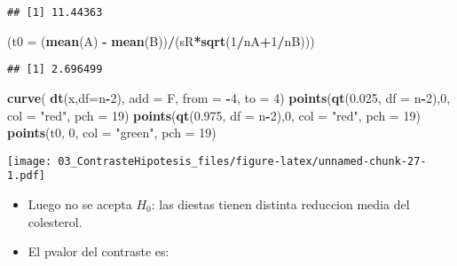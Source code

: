 \documentclass[]{article}
\newenvironment{Shaded}{\begin{snugshade}}{\end{snugshade}}
\newcommand{\KeywordTok}[1]{\textcolor[rgb]{0.13,0.29,0.53}{\textbf{#1}}}
\newcommand{\DataTypeTok}[1]{\textcolor[rgb]{0.13,0.29,0.53}{#1}}
\newcommand{\DecValTok}[1]{\textcolor[rgb]{0.00,0.00,0.81}{#1}}
\newcommand{\FloatTok}[1]{\textcolor[rgb]{0.00,0.00,0.81}{#1}}
\newcommand{\StringTok}[1]{\textcolor[rgb]{0.31,0.60,0.02}{#1}}
\newcommand{\OperatorTok}[1]{\textcolor[rgb]{0.81,0.36,0.00}{\textbf{#1}}}
\newcommand{\NormalTok}[1]{#1}
\begin{document}
\begin{verbatim}
## [1] 11.44363
\end{verbatim}

\begin{Shaded}
\begin{Highlighting}[]
\NormalTok{(}\DataTypeTok{t0 =}\NormalTok{ (}\KeywordTok{mean}\NormalTok{(A) }\OperatorTok{-}\StringTok{ }\KeywordTok{mean}\NormalTok{(B))}\OperatorTok{/}\NormalTok{(sR}\OperatorTok{*}\KeywordTok{sqrt}\NormalTok{(}\DecValTok{1}\OperatorTok{/}\NormalTok{nA}\OperatorTok{+}\DecValTok{1}\OperatorTok{/}\NormalTok{nB)))}
\end{Highlighting}
\end{Shaded}

\begin{verbatim}
## [1] 2.696499
\end{verbatim}

\begin{Shaded}
\begin{Highlighting}[]
\KeywordTok{curve}\NormalTok{( }\KeywordTok{dt}\NormalTok{(x,}\DataTypeTok{df=}\NormalTok{n}\OperatorTok{-}\DecValTok{2}\NormalTok{), }\DataTypeTok{add =}\NormalTok{ F, }\DataTypeTok{from =} \OperatorTok{-}\DecValTok{4}\NormalTok{, }\DataTypeTok{to =} \DecValTok{4}\NormalTok{)}
\KeywordTok{points}\NormalTok{(}\KeywordTok{qt}\NormalTok{(}\FloatTok{0.025}\NormalTok{, }\DataTypeTok{df =}\NormalTok{ n}\OperatorTok{-}\DecValTok{2}\NormalTok{),}\DecValTok{0}\NormalTok{, }\DataTypeTok{col =} \StringTok{"red"}\NormalTok{, }\DataTypeTok{pch =} \DecValTok{19}\NormalTok{)}
\KeywordTok{points}\NormalTok{(}\KeywordTok{qt}\NormalTok{(}\FloatTok{0.975}\NormalTok{, }\DataTypeTok{df =}\NormalTok{ n}\OperatorTok{-}\DecValTok{2}\NormalTok{),}\DecValTok{0}\NormalTok{, }\DataTypeTok{col =} \StringTok{"red"}\NormalTok{, }\DataTypeTok{pch =} \DecValTok{19}\NormalTok{)}
\KeywordTok{points}\NormalTok{(t0, }\DecValTok{0}\NormalTok{, }\DataTypeTok{col =} \StringTok{"green"}\NormalTok{, }\DataTypeTok{pch =} \DecValTok{19}\NormalTok{)}
\end{Highlighting}
\end{Shaded}

\texttt{[image: 03\_ContrasteHipotesis\_files/figure-latex/unnamed-chunk-27-1.pdf]}

\begin{itemize}
\item
  Luego no se acepta \(H_0\): las diestas tienen distinta reduccion
  media del colesterol.
\item
  El pvalor del contraste es:
\end{itemize}
\end{document}

